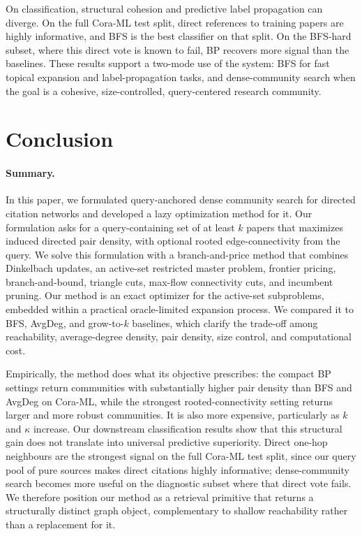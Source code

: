 \documentclass[12pt]{article}
\begin{document}
On classification, structural cohesion and predictive label propagation can diverge.  On the full Cora-ML test split, direct references to training papers are highly informative, and BFS is the best classifier on that split.  On the BFS-hard subset, where this direct vote is known to fail, BP recovers more signal than the baselines.  These results support a two-mode use of the system: BFS for fast topical expansion and label-propagation tasks, and dense-community search when the goal is a cohesive, size-controlled, query-centered research community.

\section{Conclusion}
\label{sec:conclusion}

\paragraph{Summary.}
In this paper, we formulated query-anchored dense community search for directed citation networks and developed a lazy optimization method for it.  Our formulation asks for a query-containing set of at least $k$ papers that maximizes induced directed pair density, with optional rooted edge-connectivity from the query.  We solve this formulation with a branch-and-price method that combines Dinkelbach updates, an active-set restricted master problem, frontier pricing, branch-and-bound, triangle cuts, max-flow connectivity cuts, and incumbent pruning.  Our method is an exact optimizer for the active-set subproblems, embedded within a practical oracle-limited expansion process.  We compared it to BFS, AvgDeg, and grow-to-$k$ baselines, which clarify the trade-off among reachability, average-degree density, pair density, size control, and computational cost.

Empirically, the method does what its objective prescribes: the compact BP settings return communities with substantially higher pair density than BFS and AvgDeg on Cora-ML, while the strongest rooted-connectivity setting returns larger and more robust communities.  It is also more expensive, particularly as $k$ and $\kappa$ increase.  Our downstream classification results show that this structural gain does not translate into universal predictive superiority.  Direct one-hop neighbours are the strongest signal on the full Cora-ML test split, since our query pool of pure sources makes direct citations highly informative; dense-community search becomes more useful on the diagnostic subset where that direct vote fails.  We therefore position our method as a retrieval primitive that returns a structurally distinct graph object, complementary to shallow reachability rather than a replacement for it.
\end{document}
